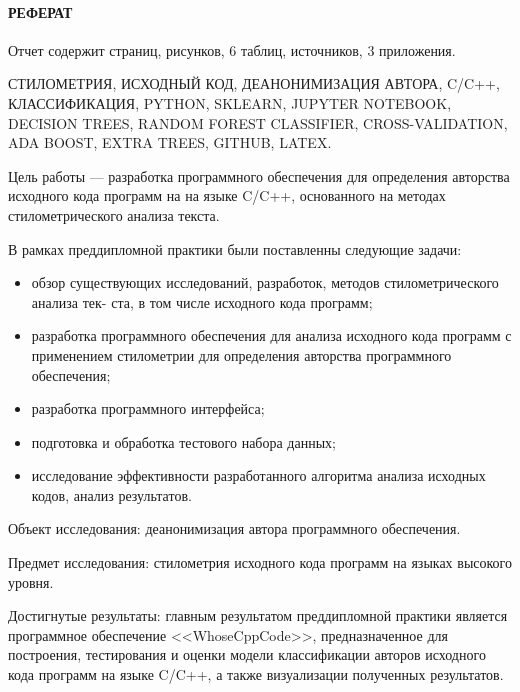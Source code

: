 \newpage
{}
\paragraph{\hfill РЕФЕРАТ \hfill}
Отчет содержит  страниц,  рисунков, 6 таблиц,  источников,
3 приложения.


СТИЛОМЕТРИЯ, ИСХОДНЫЙ КОД, ДЕАНОНИМИЗАЦИЯ АВТОРА, C/C++, КЛАССИФИКАЦИЯ, PYTHON, SKLEARN, JUPYTER NOTEBOOK, DECISION
TREES, RANDOM FOREST CLASSIFIER, CROSS-VALIDATION, ADA BOOST, EXTRA TREES, GITHUB, LATEX.

Цель работы --- разработка программного обеспечения для определения авторства исходного кода программ
на на языке C/C++, основанного на методах стилометрического анализа текста.

В рамках преддипломной практики были поставленны следующие задачи: 
\begin{itemize}
  \item обзор существующих исследований, разработок, методов стилометрического анализа тек-
ста, в том числе исходного кода программ;
  \item разработка программного обеспечения для анализа исходного кода программ с применением стилометрии для
определения авторства программного обеспечения;
  \item разработка программного интерфейса;
  \item подготовка и обработка тестового набора данных;
  \item исследование эффективности разработанного алгоритма анализа исходных кодов, анализ результатов.
\end{itemize}

Объект исследования: деанонимизация автора программного обеспечения. 

Предмет исследования: стилометрия исходного кода программ на языках высокого уровня.

Достигнутые результаты: главным результатом преддипломной практики является 
программное обеспечение <<WhoseCppCode>>, предназначенное для построения,
тестирования и оценки модели классификации авторов исходного кода программ на языке C/C++,
а также визуализации полученных результатов.

